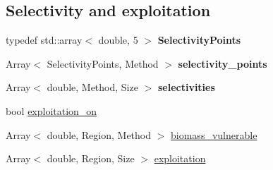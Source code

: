 \subsection*{Selectivity and exploitation}
\begin{DoxyCompactItemize}
\item 
\hypertarget{classIOSKJ_1_1Model_a925d88350f3dc87464d3893bd9307b91}{typedef std\-::array$<$ double, 5 $>$ {\bfseries Selectivity\-Points}}\label{classIOSKJ_1_1Model_a925d88350f3dc87464d3893bd9307b91}

\item 
\hypertarget{classIOSKJ_1_1Model_a2c2ff5eb6f4ed186b725c13b0e9e6012}{Array$<$ Selectivity\-Points, Method $>$ {\bfseries selectivity\-\_\-points}}\label{classIOSKJ_1_1Model_a2c2ff5eb6f4ed186b725c13b0e9e6012}

\item 
\hypertarget{classIOSKJ_1_1Model_aa59ec2970e6ab5478b29d68ad89b67d9}{Array$<$ double, Method, Size $>$ {\bfseries selectivities}}\label{classIOSKJ_1_1Model_aa59ec2970e6ab5478b29d68ad89b67d9}

\item 
bool \hyperlink{classIOSKJ_1_1Model_ab9afc5bae0ac8e16817802e54bdfa60d}{exploitation\-\_\-on}
\item 
Array$<$ double, Region, Method $>$ \hyperlink{classIOSKJ_1_1Model_a0aa015def5316af0f5ce23bdaecbf67c}{biomass\-\_\-vulnerable}
\item 
Array$<$ double, Region, Size $>$ \hyperlink{classIOSKJ_1_1Model_ad4379e82be5723f2e1b58e9492dde3dc}{exploitation}
\end{DoxyCompactItemize}
